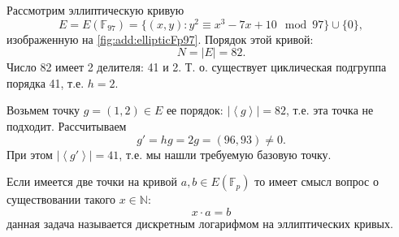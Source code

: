 


\begin{example}
\label{ex:add:elliptic:basepoint}
Рассмотрим эллиптическую кривую 
\[
E = E\left(\mathbb{F}_{97}\right) = 
\{(x,y): y^2 \equiv x^3 -7 x + 10 \mod 97 \} \cup \{0\},
\] 
изображенную на \autoref{fig:add:ellipticFp97}. Порядок этой кривой:
\[
N = \left|E\right| = 82.
\]
Число 82 имеет 2 делителя: 41 и 2. Т. о. существует циклическая
подгруппа порядка 41, т.е. $h = 2$. 

Возьмем точку $g = (1,2) \in E$ ее порядок:
$\left|\left<g\right>\right| = 82$, т.е. эта точка не подходит. 
Рассчитываем 
\[
g' = h g = 2 g = (96,93) \ne 0.
\]
При этом $\left|\left<g'\right>\right| = 41$, т.е. мы нашли требуемую
базовую точку.
\end{example}

Если имеется две точки на кривой $a, b \in E\left(\mathbb{F}_p\right)$
то имеет смысл вопрос о существовании такого $x \in \mathbb{N}$:
\[
x \cdot a = b
\]
данная задача называется дискретным логарифмом на эллиптических
кривых. 

